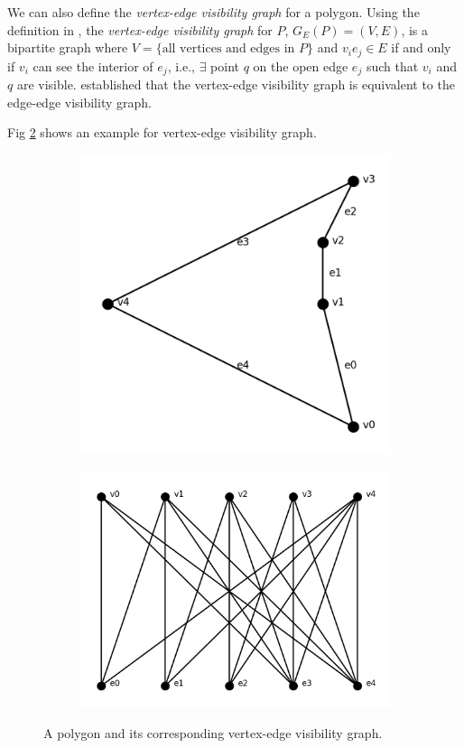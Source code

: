 \documentclass[]{styles/svproc}  %
\begin{document}
We can also define the \textit{vertex-edge visibility graph} for a polygon.
Using the definition in \cite{rourke_viz}, the
\textit{vertex-edge visibility graph} for $P$, $G_E(P) = (V, E)$, is a bipartite
graph where $V = \{\text{all vertices and edges in $P$}\}$ and $v_ie_j\in E$ if
and only if $v_i$ can see the interior of $e_j$, i.e., $\exists$ point $q$ on
the open edge $e_j$ such that $v_i$ and $q$ are visible. \cite{rourke_viz}
established that the vertex-edge visibility graph is equivalent to the edge-edge
visibility graph.

Fig \ref{fig:veg} shows an example for vertex-edge visibility graph.

\begin{figure}
\centering
\begin{subfigure}{0.25\textwidth}
  \includegraphics[width=0.6\linewidth]{figures/concave_pent.png}
  \label{fig:c_p}
\end{subfigure}%
\begin{subfigure}{0.25\textwidth}
  \includegraphics[width=0.8\linewidth]{figures/viz_edge_graph.png}
\end{subfigure}
\caption{A polygon and its corresponding vertex-edge visibility graph.\label{fig:veg}}

\end{figure}
\end{document}

